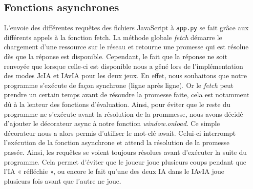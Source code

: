 \subsection{Fonctions asynchrones}
L'envoie des différentes requêtes des fichiers JavaScript à \texttt{app.py} se fait grâce aux différents appels à la fonction fetch.
La méthode globale \textit{fetch} démarre le chargement d'une ressource sur le réseau et retourne une promesse qui est résolue dès que la 
réponse est disponible. Cependant, le fait que la réponse ne soit renvoyée que lorsque celle-ci est disponible nous a gêné lors de l'implémentation
des modes JcIA et IAvIA pour les deux jeux. En effet, nous souhaitons que notre programme s'exécute de façon synchrone (ligne après ligne). 
Or le \textit{fetch} peut prendre un certain temps avant de résoudre la promesse faite, cela est notamment dû à la lenteur des fonctions d'évaluation.
Ainsi, pour éviter que le reste du programme ne s'exécute avant la résolution de la prommesse, nous avons décidé d'ajouter le décorateur 
\textsf{async} à notre fonction \textit{window.onload}. Ce simple décorateur nous a alors permis d'utiliser le mot-clé \textsf{await}. Celui-ci 
interrompt l'exécution de la fonction asynchrone et attend la résolution de la promesse passée. Ainsi, les requêtes se voient toujours résolues 
avant d'exécuter la suite du programme. Cela permet d'éviter que le joueur joue plusieurs coups pendant que l'IA « réfléchie », ou encore le fait
qu'une des deux IA dans le IAvIA joue plusieurs fois avant que l'autre ne joue.
